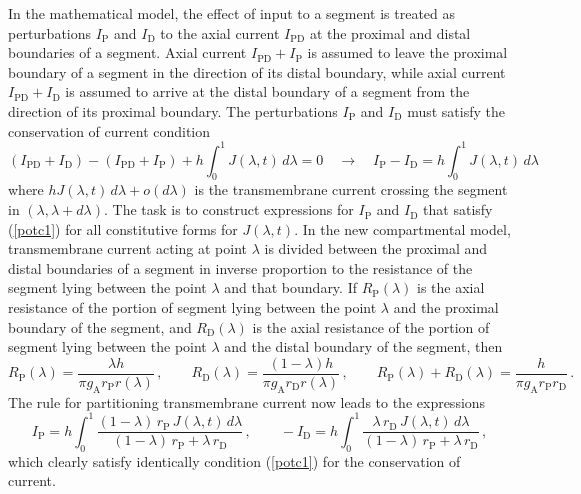 In the mathematical model, the effect of input to a segment is
treated as perturbations $I_\mathrm{P}$ and $I_\mathrm{D}$ to the
axial current $I_\mathrm{PD}$ at the proximal and distal
boundaries of a segment. Axial current
$I_\mathrm{PD}+I_\mathrm{P}$ is assumed to leave the proximal
boundary of a segment in the direction of its distal boundary,
while axial current $I_\mathrm{PD}+I_\mathrm{D}$ is assumed to
arrive at the distal boundary of a segment from the direction of
its proximal boundary. The perturbations $I_\mathrm{P}$ and
$I_\mathrm{D}$ must satisfy the conservation of current condition
\begin{equation}\label{potc1}
(I_\mathrm{PD}+I_\mathrm{D})-(I_\mathrm{PD}+I_\mathrm{P})+h\int_0^1
J(\lambda,t)\,d\lambda=0\quad\rightarrow\quad
I_\mathrm{P}-I_\mathrm{D}=h\int_0^1 J(\lambda,t)\,d\lambda
\end{equation}
where $hJ(\lambda,t)\,d\lambda+o(d\lambda)$ is the transmembrane
current crossing the segment in $(\lambda,\lambda+d\lambda)$. The
task is to construct expressions for $I_\mathrm{P}$ and
$I_\mathrm{D}$ that satisfy (\ref{potc1}) for all constitutive
forms for $J(\lambda,t)$. In the new compartmental model,
transmembrane current acting at point $\lambda$ is divided between
the proximal and distal boundaries of a segment in inverse
proportion to the resistance of the segment lying between the
point $\lambda$ and that boundary. If $R_\mathrm{P}(\lambda)$ is
the axial resistance of the portion of segment lying between the
point $\lambda$ and the proximal boundary of the segment, and
$R_\mathrm{D}(\lambda)$ is the axial resistance of the portion of
segment lying between the point $\lambda$ and the distal boundary
of the segment, then
\begin{equation}\label{potc2}
R_\mathrm{P}(\lambda) = \frac{\lambda h} {\pi g_\mathrm{A}
r_\mathrm{P} r(\lambda)}\,,\qquad R_\mathrm{D}(\lambda) =
\frac{(1-\lambda)h} {\pi g_\mathrm{A} r_\mathrm{D}
r(\lambda)}\,,\qquad R_\mathrm{P}(\lambda)+R_\mathrm{D}(\lambda) =
\frac{h} {\pi g_\mathrm{A} r_\mathrm{P} r_\mathrm{D}}\,.
\end{equation}
The rule for partitioning transmembrane current now leads to the
expressions
\begin{equation}\label{potc3}
I_\mathrm{P} = h\int_0^1 \frac{(1-\lambda)\,r_\mathrm{P}\,
J(\lambda,t)\,d\lambda}{(1-\lambda)\,r_\mathrm{P}
+\lambda\,r_\mathrm{D}}\,,\qquad -I_\mathrm{D} = h\int_0^1
\frac{\lambda\,r_\mathrm{D}\,J(\lambda,t)\,d\lambda}
{(1-\lambda)\,r_\mathrm{P}+\lambda\,r_\mathrm{D}}\,,
\end{equation}
which clearly satisfy identically condition (\ref{potc1}) for the
conservation of current.

